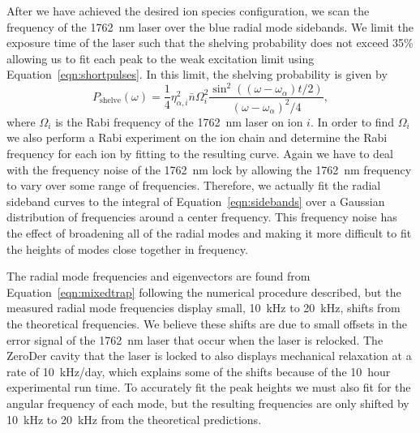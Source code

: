 After we have achieved the desired ion species configuration, we scan the frequency of the 1762~nm laser over the blue radial mode sidebands.  We limit the exposure time of the laser such that the shelving probability does not exceed 35\% allowing us to fit each peak to the weak excitation limit using Equation~\ref{eqn:shortpulses}.   In this limit, the shelving probability is given by
\begin{equation}
	P_\mathrm{shelve}(\omega) = \frac{1}{4} \eta_{\alpha, i}^2 \bar{n} \Omega_i^2 \frac{ \sin^2( (\omega - \omega_\alpha) t / 2) }{ (\omega - \omega_\alpha)^2 / 4 } \mathrm{,}
	\label{eqn:sidebands}
\end{equation}
where $\Omega_i$ is the Rabi frequency of the 1762~nm laser on ion $i$. In order to find $\Omega_i$ we also perform a Rabi experiment on the ion chain and determine the Rabi frequency for each ion by fitting to the resulting curve.  Again we have to deal with the frequency noise of the 1762~nm lock by allowing the 1762~nm frequency to vary over some range of frequencies.  Therefore, we actually fit the radial sideband curves to the integral of Equation~\ref{eqn:sidebands} over a Gaussian distribution of frequencies around a center frequency.  This frequency noise has the effect of broadening all of the radial modes and making it more difficult to fit the heights of modes close together in frequency.

The radial mode frequencies and eigenvectors are found from Equation~\ref{eqn:mixedtrap} following the numerical procedure described, but the measured radial mode frequencies display small, 10~kHz to 20~kHz, shifts from the theoretical frequencies.  We believe these shifts are due to small offsets in the error signal of the 1762~nm laser that occur when the laser is relocked.  The ZeroDer cavity that the laser is locked to also displays mechanical relaxation at a rate of 10~kHz/day, which explains some of the shifts because of the 10~hour experimental run time.  To accurately fit the peak heights we must also fit for the angular frequency of each mode, but the resulting frequencies are only shifted by 10~kHz to 20~kHz from the theoretical predictions.

